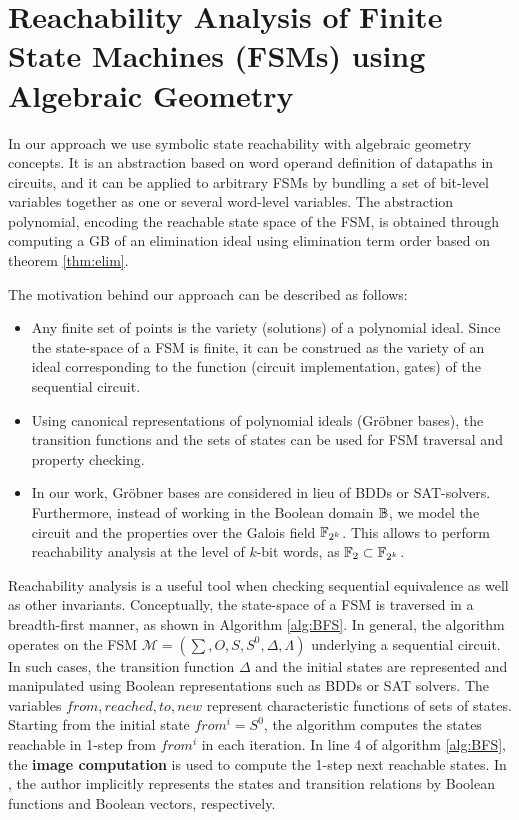 \section{Reachability Analysis of Finite State Machines (FSMs) using Algebraic Geometry}
In our approach we use symbolic state reachability with algebraic
geometry concepts. It is an abstraction based on word operand
definition of datapaths in circuits, and it can be applied
to arbitrary FSMs by bundling a set of bit-level variables together as
one or several word-level variables.  The abstraction polynomial,
encoding the reachable state space of the FSM, is obtained through
computing a GB of an elimination ideal using elimination term order
based on theorem \ref{thm:elim}.  

The motivation behind our approach can be described as follows:
\begin{itemize}
\item Any finite set of points is the variety (solutions) of a
  polynomial ideal. Since the state-space of a FSM is finite, it can
  be construed as the variety of an ideal corresponding to the
  function (circuit implementation, gates) of the   sequential circuit.
\item Using canonical representations of polynomial ideals (Gr\"obner
  bases), the transition functions and the sets of states can be used
  for FSM traversal and property checking. 
\item In our work, Gr\"obner bases are considered in lieu of BDDs or
  SAT-solvers. Furthermore, instead of working in the Boolean domain
  ${\mathbb{B}}$, we model the circuit and the properties over the Galois field
  ${\mathbb{F}}_{2^k}$. This allows to perform reachability analysis at the level of
  $k$-bit words, as $\mathbb{F}_2 \subset {\mathbb{F}}_{2^k}$.

\end{itemize}

Reachability analysis is a useful tool when checking sequential
equivalence as well as other invariants. 
Conceptually, the state-space of a FSM is traversed in a breadth-first
manner, as shown in Algorithm \ref{alg:BFS}. %
In general, the algorithm operates on the FSM 
$\mathcal{M} = (\sum, O, S, S^0, \Delta, \Lambda)$ underlying a
sequential circuit. In such cases, the transition function $\Delta$
and the initial states are represented and manipulated using Boolean
representations such as BDDs or SAT solvers. The variables $from,
reached, to, new$ represent characteristic functions of sets of
states. Starting from the initial state $from^i = S^0$, the algorithm
computes the states reachable in 1-step from $from^i$ in each iteration.
In line 4 of algorithm \ref{alg:BFS}, the {\bf image computation} is
used to compute the 1-step next reachable states. In
\cite{KallaPartialScan}, the author implicitly represents the states
and transition relations by Boolean functions and Boolean vectors,
respectively. 


